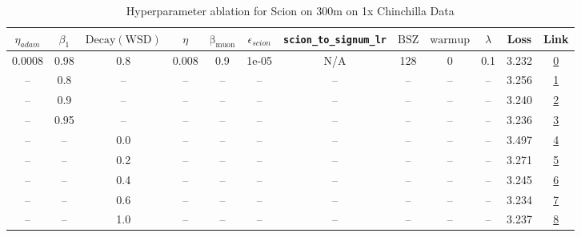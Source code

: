 \begin{table}[H]
\centering
\caption{Hyperparameter ablation for Scion on 300m on 1x Chinchilla Data}
\label{tab:ablation_scion_300m_1}
\begin{tabular}{cccccccccccc}
\toprule
$\eta_{adam}$ & $\beta_1$ & $\mathrm{Decay (WSD)}$ & $\eta$ & $\mathrm{\beta_{muon}}$ & $\epsilon_{scion}$ & \texttt{scion\_to\_signum\_lr} & $\mathrm{BSZ}$ & $\mathrm{warmup}$ & $\lambda$ & Loss & Link \\
\midrule
0.0008 & 0.98 & 0.8 & 0.008 & 0.9 & 1e-05 & N/A & 128 & 0 & 0.1 & 3.232 & \href{https://wandb.ai/stanford-mercury/optimizer-scaling/runs/sweep-300m-6B-sciond108279lr0.008-wd0.1-minlr0-warmup0-b10.98-gn-99a9f4}{0} \\
\midrule
-- & 0.8 & -- & -- & -- & -- & -- & -- & -- & -- & 3.256 & \href{https://wandb.ai/stanford-mercury/optimizer-scaling/runs/sweep-300m-6B-sciond3c2ebclr0.008-wd0.1-minlr0-warmup0-b10.8-gn2-8c6e43}{1} \\
-- & 0.9 & -- & -- & -- & -- & -- & -- & -- & -- & 3.240 & \href{https://wandb.ai/stanford-mercury/optimizer-scaling/runs/sweep-300m-6B-sciond8d2973lr0.008-wd0.1-minlr0-warmup0-b10.9-gn2-1189a9}{2} \\
-- & 0.95 & -- & -- & -- & -- & -- & -- & -- & -- & 3.236 & \href{https://wandb.ai/stanford-mercury/optimizer-scaling/runs/sweep-300m-6B-sciondd97ff2lr0.008-wd0.1-minlr0-warmup0-b10.95-gn-16dc4b}{3} \\
-- & -- & 0.0 & -- & -- & -- & -- & -- & -- & -- & 3.497 & \href{https://wandb.ai/stanford-mercury/optimizer-scaling/runs/sweep-300m-6B-sciond7cb949lr0.008-wd0.1-minlr0-warmup0-b10.98-gn-78e5fe}{4} \\
-- & -- & 0.2 & -- & -- & -- & -- & -- & -- & -- & 3.271 & \href{https://wandb.ai/stanford-mercury/optimizer-scaling/runs/sweep-300m-6B-sciondf6ecb9lr0.008-wd0.1-minlr0-warmup0-b10.98-gn-cafe64}{5} \\
-- & -- & 0.4 & -- & -- & -- & -- & -- & -- & -- & 3.245 & \href{https://wandb.ai/stanford-mercury/optimizer-scaling/runs/sweep-300m-6B-sciond4823d5lr0.008-wd0.1-minlr0-warmup0-b10.98-gn-330e18}{6} \\
-- & -- & 0.6 & -- & -- & -- & -- & -- & -- & -- & 3.234 & \href{https://wandb.ai/stanford-mercury/optimizer-scaling/runs/sweep-300m-6B-sciond582086lr0.008-wd0.1-minlr0-warmup0-b10.98-gn-14e557}{7} \\
-- & -- & 1.0 & -- & -- & -- & -- & -- & -- & -- & 3.237 & \href{https://wandb.ai/stanford-mercury/optimizer-scaling/runs/sweep-300m-6B-sciondaa2504lr0.008-wd0.1-minlr0-warmup0-b10.98-gn-fbb75e}{8} \\

\end{tabular}
\end{table}
